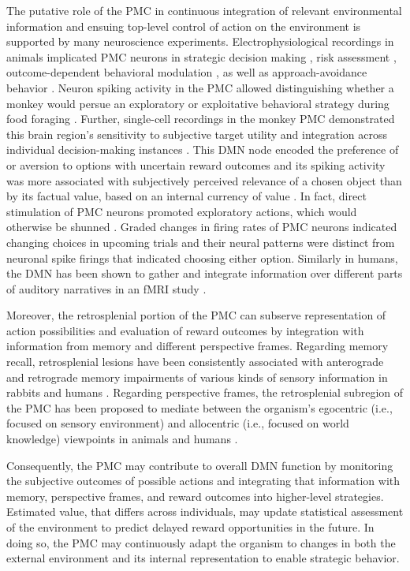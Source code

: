 \documentclass[10pt,letterpaper]{article}
\begin{document}
The putative role of the PMC in continuous integration of
relevant environmental information
and ensuing top-level control of action on the environment is supported
by many neuroscience experiments.
Electrophysiological recordings in animals implicated PMC neurons in
strategic decision making \citep{pearson2009neurons},
risk assessment \citep{mccoy2005risk},
outcome-dependent behavioral modulation \citep{hayden2009electrophysiological},
as well as approach-avoidance behavior
\citep{vann2009does}.
Neuron spiking activity in the PMC allowed distinguishing
whether a monkey would persue an exploratory or exploitative
behavioral strategy during food foraging \citep{pearson2009neurons}.
Further, single-cell recordings in the monkey PMC
demonstrated this brain region's sensitivity to
subjective target utility \citep{mccoy2005risk} and integration
across individual decision-making instances \citep{pearson2009neurons}.
This DMN node encoded the
preference of or aversion to options with uncertain reward outcomes
and its spiking activity was more associated with
subjectively perceived relevance of a chosen object
than by its factual value,
based on an internal currency of value \citep{mccoy2005risk}.
In fact, direct stimulation of PMC neurons
promoted exploratory actions,
which would otherwise be shunned \citep{hayden2008stim}.
Graded changes in firing rates of PMC neurons
indicated changing choices in upcoming trials and their neural patterns were
distinct from neuronal spike firings that indicated choosing either option.
Similarly in humans,
the DMN has been shown to gather and integrate information
over different parts of auditory narratives in an fMRI study
\citep{simony2016dynamic}.


Moreover, the retrosplenial portion of the PMC can subserve
representation of action possibilities
and evaluation of reward outcomes by integration with
information from memory and different perspective frames.
Regarding memory recall, retrosplenial lesions have been
consistently associated with anterograde and retrograde memory impairments
of various kinds of sensory information
in rabbits and humans
\citep{vann2009does}.
Regarding perspective frames, the retrosplenial subregion of the PMC has been
proposed to mediate between the organism's egocentric
(i.e., focused on sensory environment) and
allocentric (i.e., focused on world knowledge) viewpoints
in animals and humans
\citep{epstein2008parahippocampal, burgess2008spatial, valiquette2007different}.



Consequently, the PMC may contribute to overall DMN function
by monitoring the subjective outcomes
of possible actions and integrating that information
with memory, perspective frames, and
reward outcomes into higher-level strategies.
Estimated value, that differs across individuals, may update
statistical assessment of the environment
to predict delayed reward opportunities in the future.
In doing so, the PMC may continuously adapt the organism to changes
in both the external environment and its internal representation
to enable strategic behavior.
\end{document}
